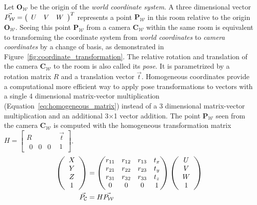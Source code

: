 Let $\mathbf{O_\mathcal{W}}$ be the origin of the \emph{world coordinate system}.
A three dimensional vector $\vec{P_\mathcal{W}} = \left(\begin{array}{ccc} U & V & W \end{array}\right)^T$ represents a point $\mathbf{P_\mathcal{W}}$ in this room relative to the origin $\mathbf{O_\mathcal{W}}$.
Seeing this point $\mathbf{P_\mathcal{W}}$ from a camera $\mathbf{C_\mathcal{W}}$ within the same room is equivalent to transforming the coordinate system from \emph{world coordinates} to \emph{camera coordinates} by a change of basis, as demonstrated in Figure~\ref{fig:coordinate_transformation}.
The relative rotation and translation of the camera $\mathbf{C_\mathcal{W}}$ to the room is also called its \emph{pose}\cite[p.15-39]{corke_2011}.
It is parametrized by a rotation matrix $R$ and a translation vector $\vec{t}$.
Homogeneous coordinates provide a computational more efficient way to apply pose transformations to vectors with a single 4 dimensional matrix-vector multiplication (Equation~\ref{eq:homogeneous_matrix}) instead of a 3 dimensional matrix-vector multiplication and an additional 3$\times$1 vector addition.
The point $\mathbf{P_\mathcal{W}}$ seen from the camera $\mathbf{C_\mathcal{W}}$ is computed with the homogeneous transformation matrix $H = \begin{bmatrix} R & \vec{t} \\ \begin{matrix}0 & 0 & 0\end{matrix} & 1 \end{bmatrix}$.
\begin{equation}
\begin{aligned}
    \left(\begin{array}{c} X \\ Y \\ Z \\ 1\end{array}\right)&= \begin{pmatrix}
        r_{11} & r_{12} & r_{13} & t_x \\
        r_{21} & r_{22} & r_{23} & t_y \\
        r_{31} & r_{32} & r_{33} & t_z \\
        0      & 0      & 0      & 1 \\
    \end{pmatrix} \left(\begin{array}{c} U \\ V \\ W \\ 1\end{array}\right) \\
    \vec{P_\mathcal{C}} &= H \vec{P_\mathcal{W}}
\end{aligned}
\label{eq:homogeneous_matrix}
\end{equation}
